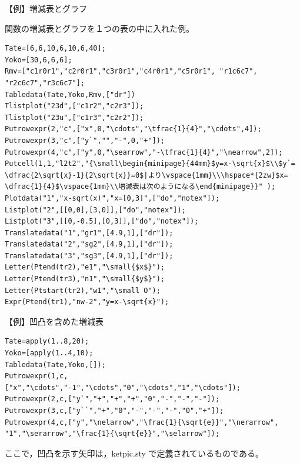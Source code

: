 \documentclass[papersize,a4paper,12pt,uplatex]{jsarticle}
\begin{document}
\begin{description}
\vspace{\baselineskip}
 \begin{center}\scalebox{0.9}{ } \end{center}


\vspace{\baselineskip}
【例】増減表とグラフ

関数の増減表とグラフを１つの表の中に入れた例。
\begin{verbatim}
Tate=[6,6,10,6,10,6,40];
Yoko=[30,6,6,6];
Rmv=["c1r0r1","c2r0r1","c3r0r1","c4r0r1","c5r0r1", "r1c6c7",
"r2c6c7","r3c6c7"]; 
Tabledata(Tate,Yoko,Rmv,["dr"])
Tlistplot("23d",["c1r2","c2r3"]);
Tlistplot("23u",["c1r3","c2r2"]);
Putrowexpr(2,"c",["x",0,"\cdots","\tfrac{1}{4}","\cdots",4]);
Putrowexpr(3,"c",["y`","","-",0,"+"]);
Putrowexpr(4,"c",["y",0,"\searrow","-\tfrac{1}{4}","\nearrow",2]);
Putcell(1,1,"l2t2","{\small\begin{minipage}{44mm}$y=x-\sqrt{x}$\\$y`=
\dfrac{2\sqrt{x}-1}{2\sqrt{x}}=0$|より\vspace{1mm}\\\hspace*{2zw}$x=
\dfrac{1}{4}$\vspace{1mm}\\増減表は次のようになる\end{minipage}}" );
Plotdata("1","x-sqrt(x)","x=[0,3]",["do","notex"]);
Listplot("2",[[0,0],[3,0]],["do","notex"]);
Listplot("3",[[0,-0.5],[0,3]],["do","notex"]);
Translatedata("1","gr1",[4.9,1],["dr"]);
Translatedata("2","sg2",[4.9,1],["dr"]);
Translatedata("3","sg3",[4.9,1],["dr"]);
Letter(Ptend(tr2),"e1","\small{$x$}");
Letter(Ptend(tr3),"n1","\small{$y$}");
Letter(Ptstart(tr2),"w1","\small O");
Expr(Ptend(tr1),"nw-2","y=x-\sqrt{x}");
\end{verbatim}
\begin{center}  \end{center}

\vspace{\baselineskip}
【例】凹凸を含めた増減表
\begin{verbatim}
Tate=apply(1..8,20);
Yoko=[apply(1..4,10);
Tabledata(Tate,Yoko,[]);
Putrowexpr(1,c,["x","\cdots","-1","\cdots","0","\cdots","1","\cdots"]);
Putrowexpr(2,c,["y`","+","+","+","0","-","-","-"]);
Putrowexpr(3,c,["y``","+","0","-","-","-","0","+"]);
Putrowexpr(4,c,["y","\nelarrow","\frac{1}{\sqrt{e}}","\nerarrow",
"1","\serarrow","\frac{1}{\sqrt{e}}","\selarrow"]);
\end{verbatim}
\begin{center}  \end{center}
ここで，凹凸を示す矢印は，ketpic.sty で定義されているものである。


\end{description}
\end{document}
